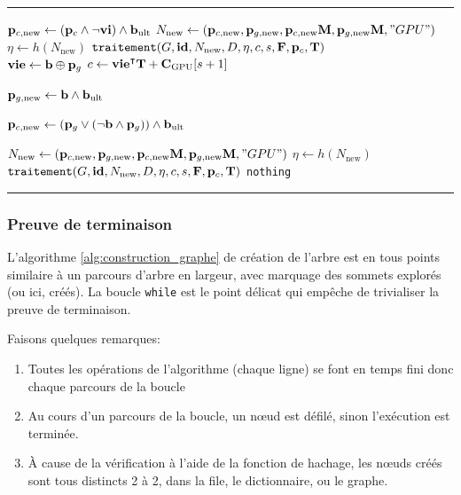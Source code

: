 \documentclass[svgnames,dvipsnames,a4paper,10pt,french]{report}
\makeatletter
\newenvironment{breakablealgorithm} %
  {%
   \begin{center}
     \refstepcounter{algorithm}%
     \hrule height.8pt depth0pt \kern2pt%
     \renewcommand{\caption}[2][\relax]{%
       {\raggedright\textbf{\fname@algorithm~\thealgorithm} ##2\par}%
       \ifx\relax##1\relax %
         \addcontentsline{loa}{algorithm}{\protect\numberline{\thealgorithm}##2}%
       \else %
         \addcontentsline{loa}{algorithm}{\protect\numberline{\thealgorithm}##1}%
       \fi
       \kern2pt\hrule\kern2pt
     }
  }{%
     \kern2pt\hrule\relax%
   \end{center}
  }
\makeatother
\begin{document}
\begin{appendices}
\begin{breakablealgorithm}
\begin{algorithmic}[1]
        \State $\mathbf{p}_{c,\text{new}} \gets (\mathbf{p}_{c} \land \lnot  \mathbf{vi}) \land \mathbf{b}_{\text{ult}}$ 
        \State $N_{\text{new}} \gets (\mathbf{p}_{c,\text{new}}, \mathbf{p}_{g,\text{new}}, \mathbf{p}_{c,\text{new}}\mathbf{M}, \mathbf{p}_{g,\text{new}}\mathbf{M}, "GPU")$ 
        \State $\eta  \gets h(N_{\text{new}})$ 
        \State $\texttt{traitement}(G, \mathbf{id}, N_{\text{new}}, D, \eta, c, s, \mathbf{F}, \mathbf{p}_c, \mathbf{T})$
\[\]
     
        \State $\mathbf{vie} \gets \mathbf{b} \oplus  \mathbf{p}_g$ 
        \State $c \gets \mathbf{vie}^\intercal \mathbf{T} + \mathbf{C}_{\text{GPU}}[s+1]$ 
        
        \State $\mathbf{p}_{g,\text{new}} \gets \mathbf{b} \land \mathbf{b}_{\text{ult}}$ 
        
        \State $\mathbf{p}_{c,\text{new}} \gets (\mathbf{p}_g \lor (\lnot \mathbf{b} \land \mathbf{p}_g )) \land \mathbf{b}_{\text{ult}}$ 
        
        \State $N_{\text{new}} \gets (\mathbf{p}_{c,\text{new}}, \mathbf{p}_{g,\text{new}}, \mathbf{p}_{c,\text{new}}\mathbf{M}, \mathbf{p}_{g,\text{new}}\mathbf{M}, "GPU")$ 
        \State $\eta  \gets h(N_{\text{new}})$ 
        \State $\texttt{traitement}(G, \mathbf{id}, N_{\text{new}}, D, \eta, c, s, \mathbf{F}, \mathbf{p}_c, \mathbf{T})$
    \Else {}
        \State \texttt{nothing}
    \EndIf

\EndIf
\EndWhile
\EndProcedure
\end{algorithmic}
\end{breakablealgorithm}

\subsubsection{Preuve de terminaison}
L'algorithme \ref{alg:construction_graphe} de création de l'arbre est en tous points similaire à un parcours d'arbre en largeur, avec marquage des sommets explorés (ou ici, créés).
La boucle \texttt{while} est le point délicat qui empêche de trivialiser la preuve de terminaison.

Faisons quelques  remarques:
\begin{enumerate}[label=(\subscript{P}{{\arabic*}})]
    \item Toutes les opérations de l'algorithme (chaque ligne) se font en temps fini donc chaque parcours de la boucle 
    \item Au cours d'un parcours de la boucle, un n\oe{}ud est défilé, sinon l'exécution est terminée.
    \item À cause de la vérification à l'aide de la fonction de hachage, les n\oe{}uds créés sont tous distincts 2 à 2, dans la file, le dictionnaire, ou le graphe.
    

\end{enumerate}
\end{appendices}
\end{document}
